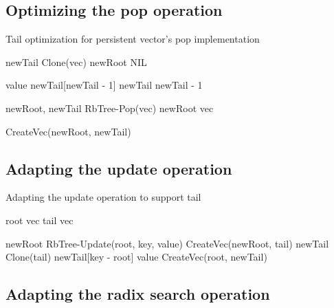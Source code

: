 \subsection*{Optimizing the pop operation}

\begin{listing}[ht!]
    \caption{Tail optimization for persistent vector’s pop implementation}
    \label{lst:pvec-pop}
    
    \begin{algorithmic}
        
        \State newTail \la Clone(vec)
        \State newRoot \la NIL

        \State value \la newTail[newTail - 1]
        \State newTail \la newTail - 1     
            
            \State newRoot, newTail \la RbTree-Pop(vec)            
        \Else 
            \State newRoot \la vec
        \EndIf
        
        \State \Return CreateVec(newRoot, newTail)
        \EndFunction
    \end{algorithmic}
\end{listing}

\subsection*{Adapting the update operation}

\begin{listing}[ht!]
    \caption{Adapting the update operation to support tail}
    \label{lst:pvec-update}
    
    \begin{algorithmic}

        \State root \la vec
        \State tail \la vec

            \State newRoot \la RbTree-Update(root, key, value)
            \State \Return CreateVec(newRoot, tail)
        \Else
            \State newTail \la Clone(tail)
            \State newTail[key - root] \la value
            \State \Return CreateVec(root, newTail)
        \EndIf        
        \EndFunction
    \end{algorithmic}
\end{listing}

\subsection*{Adapting the radix search operation}

